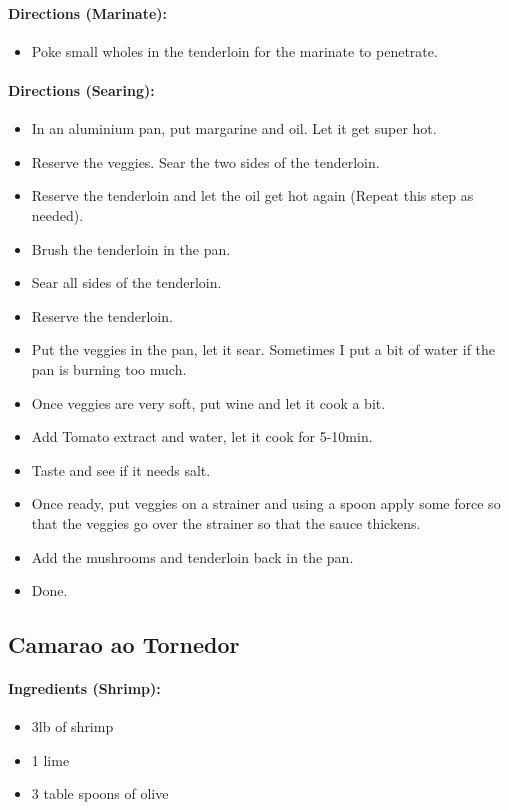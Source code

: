 \documentclass{article}
\begin{document}
\paragraph{Directions (Marinate):}
\begin{itemize}
	\item Poke small wholes in the tenderloin for the marinate to penetrate.
\end{itemize}

\paragraph{Directions (Searing):}
\begin{itemize}
	\item In an aluminium pan, put margarine and oil. Let it get super hot.
	\item Reserve the veggies. Sear the two sides of the tenderloin.
	\item Reserve the tenderloin and let the oil get hot again (Repeat this step as needed).
	\item Brush the tenderloin in the pan.
	\item Sear all sides of the tenderloin.
	\item Reserve the tenderloin.
	\item Put the veggies in the pan, let it sear. Sometimes I put a bit of water if the pan is burning too much.
	\item Once veggies are very soft, put wine and let it cook a bit.
	\item Add Tomato extract and water, let it cook for 5-10min.
	\item Taste and see if it needs salt.
	\item Once ready, put veggies on a strainer and using a spoon apply some force so that the veggies go over the strainer so that the sauce thickens.
	\item Add the mushrooms and tenderloin back in the pan.
	\item Done.
\end{itemize}

\subsection{Camarao ao Tornedor}

\paragraph{Ingredients (Shrimp):}
\begin{itemize}
	\item 3lb of shrimp
	\item 1 lime
	\item 3 table spoons of olive
\end{itemize}
\end{document}
